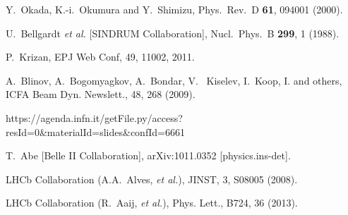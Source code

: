 \begin{thebibliography}{99}
 
 
    Y.~Okada, K.-i.~Okumura and Y.~Shimizu, Phys.\ Rev.\ D {\bf 61}, 094001 (2000).
 
  U.~Bellgardt {\it et al.}  [SINDRUM Collaboration],
  Nucl.\ Phys.\ B {\bf 299}, 1 (1988).

%
%
P.~Krizan, EPJ Web Conf, 49, 11002, 2011.

A.~Blinov, A.~Bogomyagkov, A.~Bondar, V.~ Kiselev, I.~Koop, I. and others,
ICFA Beam Dyn. Newslett., 48, 268 (2009).

{\small https://agenda.infn.it/getFile.py/access?resId=0\&materialId=slides\&confId=6661}

  T.~Abe [Belle II Collaboration],
  arXiv:1011.0352 [physics.ins-det].

LHCb Collaboration (A.A.~Alves, {\it et al.}),
JINST, 3, S08005 (2008).


LHCb Collaboration (R.~Aaij, {\it et al.}),
Phys. Lett., B724, 36 (2013).


\end{thebibliography}
